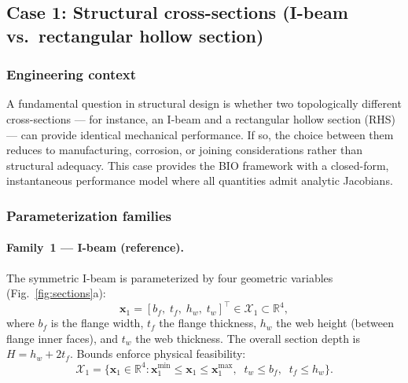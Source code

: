\subsection{Case 1: Structural cross-sections (I-beam vs.\ rectangular hollow section)}
\label{sec:case_structural}

\subsubsection{Engineering context}

A fundamental question in structural design is whether two topologically different cross-sections --- for instance, an I-beam and a rectangular hollow section (RHS) --- can provide identical mechanical performance. If so, the choice between them reduces to manufacturing, corrosion, or joining considerations rather than structural adequacy. This case provides the BIO framework with a closed-form, instantaneous performance model where all quantities admit analytic Jacobians.

\subsubsection{Parameterization families}

\paragraph{Family~1 --- I-beam (reference).}
The symmetric I-beam is parameterized by four geometric variables (Fig.~\ref{fig:sections}a):
\begin{equation}
    \mathbf{x}_1 = [b_f,\; t_f,\; h_w,\; t_w]^\top \in \mathcal{X}_1 \subset \mathbb{R}^4,
    \label{eq:ibeam_params}
\end{equation}
where $b_f$ is the flange width, $t_f$ the flange thickness, $h_w$ the web height (between flange inner faces), and $t_w$ the web thickness. The overall section depth is $H = h_w + 2t_f$. Bounds enforce physical feasibility:
\begin{equation}
    \mathcal{X}_1 = \bigl\{ \mathbf{x}_1 \in \mathbb{R}^4 : \mathbf{x}_1^{\min} \leq \mathbf{x}_1 \leq \mathbf{x}_1^{\max},\;\; t_w \leq b_f,\;\; t_f \leq h_w \bigr\}.
\end{equation}

